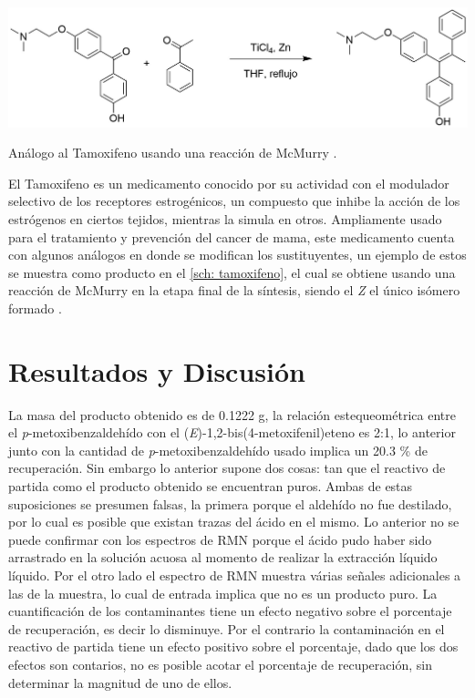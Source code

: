 \documentclass[fleqn,11pt]{SelfArx}
\begin{document}
\begin{scheme}[h]
	\centering
	\includegraphics[width=0.9\linewidth]{structures/Tamoxifeno.png}
	\caption{An\'alogo al Tamoxifeno usando una reacci\'on de McMurry \cite{Zheng2007}.}
	\label{sch: tamoxifeno}
\end{scheme}
El Tamoxifeno es un medicamento conocido por su actividad con el modulador selectivo de los receptores estrog\'enicos, un compuesto que inhibe la acci\'on de los estr\'ogenos en ciertos tejidos, mientras la simula en otros. Ampliamente usado para el tratamiento y prevenci\'on del cancer de mama, este medicamento cuenta con algunos an\'alogos en donde se modifican los sustituyentes, un ejemplo de estos se muestra como producto en el \autoref{sch: tamoxifeno}, el cual se obtiene usando una reacci\'on de McMurry en la etapa final de la s\'intesis, siendo el \textit{Z} el \'unico is\'omero formado \cite{Zheng2007}.

\section{Resultados y Discusi\'on}
La masa del producto obtenido es de 0.1222 g, la relaci\'on estequeom\'etrica entre el \textit{p}-metoxibenzaldeh\'ido con el (\textit{E})-1,2-bis(4-metoxifenil)eteno es 2:1, lo anterior junto con la cantidad de \textit{p}-metoxibenzaldeh\'ido usado implica un 20.3 \% de recuperaci\'on. Sin embargo lo anterior supone dos cosas: tan que el reactivo de partida como el producto obtenido se encuentran puros. Ambas de estas suposiciones se presumen falsas, la primera porque el aldeh\'ido no fue destilado, por lo cual es posible que existan trazas del \'acido en el mismo. Lo anterior no se puede confirmar con los espectros de RMN porque el \'acido pudo haber sido arrastrado en la soluci\'on acuosa al momento de realizar la extracci\'on l\'iquido l\'iquido. Por el otro lado el espectro de RMN muestra v\'arias señales adicionales a las de la muestra, lo cual de entrada implica que no es un producto puro. La cuantificaci\'on de los contaminantes tiene un efecto negativo sobre el porcentaje de recuperaci\'on, es decir lo disminuye. Por el contrario la contaminaci\'on en el reactivo de partida tiene un efecto positivo sobre el porcentaje, dado que los dos efectos son contarios, no es posible acotar el porcentaje de recuperaci\'on, sin determinar la magnitud de uno de ellos.
\end{document}
